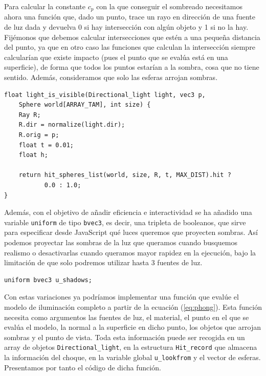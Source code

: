 Para calcular la constante $c_p$ con la que conseguir el sombreado necesitamos ahora una función que, dado un punto, trace un rayo en dirección de una fuente de luz dada y devuelva 0 si hay intersección con algún objeto y 1 si no la hay. Fijémonos que debemos calcular intersecciones que estén a una pequeña distancia del punto, ya que en otro caso las funciones que calculan la intersección siempre calcularían que existe impacto (pues el punto que se evalúa está en una superficie), de forma que todos los puntos estarían a la sombra, cosa que no tiene sentido. Además, consideramos que solo las esferas arrojan sombras.

\begin{lstlisting}
float light_is_visible(Directional_light light, vec3 p, 
    Sphere world[ARRAY_TAM], int size) {
    Ray R;
    R.dir = normalize(light.dir);
    R.orig = p;
    float t = 0.01;
    float h;

    return hit_spheres_list(world, size, R, t, MAX_DIST).hit ? 
           0.0 : 1.0; 
}
\end{lstlisting}

Además, con el objetivo de añadir eficiencia e interactividad se ha añadido una variable \verb|uniform| de tipo \verb|bvec3|, es decir, una tripleta de booleanos, que sirve para especificar desde JavaScript qué luces queremos que proyecten sombras. Así podemos proyectar las sombras de la luz que queramos cuando busquemos realismo o desactivarlas cuando queramos mayor rapidez en la ejecución, bajo la limitación de que solo podremos utilizar hasta 3 fuentes de luz.

\begin{lstlisting}
uniform bvec3 u_shadows;
\end{lstlisting}

Con estas variaciones ya podríamos implementar una función que evalúe el modelo de iluminación completo a partir de la ecuación (\ref{eq:phong}). Esta función necesita como argumentos las fuentes de luz, el material, el punto en el que se evalúa el modelo, la normal a la superficie en dicho punto, los objetos que arrojan sombras y el punto de vista. Toda esta información puede ser recogida en un array de objetos \verb|Directional_light|, en la estructura \verb|Hit_record| que almacena la información del choque, en la variable global \verb|u_lookfrom| y el vector de esferas. Presentamos por tanto el código de dicha función.

